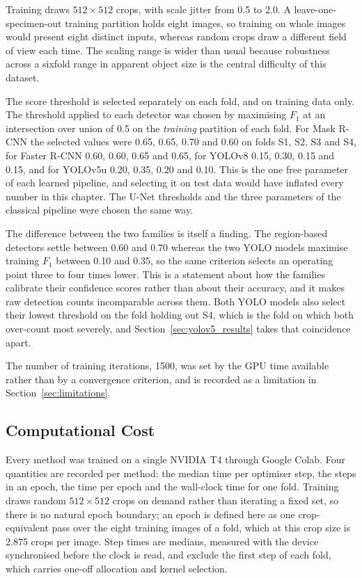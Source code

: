 Training draws $512 \times 512$ crops, with scale jitter from 0.5 to 2.0. A
leave-one-specimen-out training partition holds eight images, so training on
whole images would present eight distinct inputs, whereas random crops draw a
different field of view each time. The scaling range is wider than usual because
robustness across a sixfold range in apparent object size is the central
difficulty of this dataset.

The score threshold is selected separately on each fold, and on training data
only. The threshold applied to each detector was chosen by maximising $F_1$ at an intersection over
union of 0.5 on the \emph{training} partition of each fold. For Mask R-CNN the
selected values were 0.65, 0.65, 0.70 and 0.60 on folds S1, S2, S3 and S4, for
Faster R-CNN 0.60, 0.60, 0.65 and 0.65, for YOLOv8 0.15, 0.30, 0.15 and 0.15, and
for YOLOv5u 0.20, 0.35, 0.20 and 0.10. This is the one free parameter of each
learned pipeline, and selecting it on test data would have inflated every number
in this chapter. The U-Net thresholds and the three parameters of the classical
pipeline were chosen the same way.

The difference between the two families is itself a finding. The region-based detectors
settle between 0.60 and 0.70 whereas the two YOLO models maximise training $F_1$
between 0.10 and 0.35, so the same criterion selects an operating point three to
four times lower. This is a statement about how the families calibrate their
confidence scores rather than about their accuracy, and it makes raw detection
counts incomparable across them. Both YOLO models also select their lowest
threshold on the fold holding out S4, which is the fold on which both over-count
most severely, and Section~\ref{sec:yolov5_results} takes that coincidence apart.

The number of training iterations, 1500, was set by the GPU time available
rather than by a convergence criterion, and is recorded as a limitation in
Section~\ref{sec:limitations}.

\subsection{Computational Cost}
\label{sec:runtime}

Every method was trained on a single NVIDIA T4 through Google Colab. Four
quantities are recorded per method: the median time per optimiser step, the steps
in an epoch, the time per epoch and the wall-clock time for one fold. Training
draws random $512 \times 512$ crops on demand rather than iterating a fixed set,
so there is no natural epoch boundary; an epoch is defined here as one
crop-equivalent pass over the eight training images of a fold, which at this
crop size is 2.875 crops per image. Step times are medians, measured with the
device synchronised before the clock is read, and exclude the first step of each
fold, which carries one-off allocation and kernel selection.

